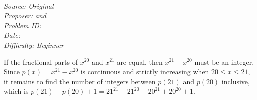 \SSbreak\\
\emph{Source: Original}\\
\emph{Proposer: \Ptan and \Pwen}\\
\emph{Problem ID:}\\
\emph{Date: }\\
\emph{Difficulty: Beginner}\\
\SSbreak

\bigskip

\begin{solution}\hfil\medskip
  
    If the fractional parts of $x^{20}$ and $x^{21}$ are equal, then $x^{21} - x^{20}$ must be an integer. Since $p(x) = x^{21} - x^{20}$ is continuous and
    strictly increasing when $20 \leq x \leq 21$, it remains to find the number of integers between $p(21)$ and $p(20)$ inclusive, 
    which is $p(21) - p(20) + 1 = \boxed{21^{21} - 21^{20} - 20^{21} + 20^{20} + 1}$.
\end{solution}\bigskip
